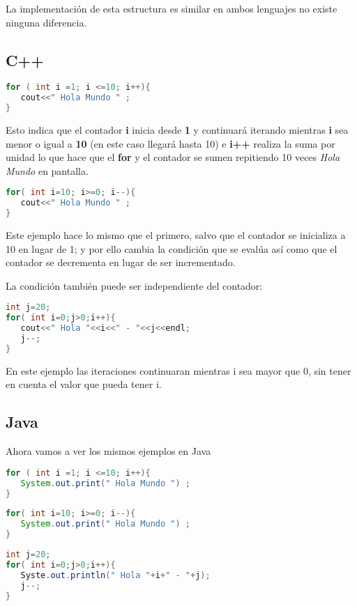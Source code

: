 La implementación de esta estructura es similar en ambos lenguajes no existe ninguna diferencia.

\subsection{C++}
\begin{lstlisting}[language=C++]
for ( int i =1; i <=10; i++){
   cout<<" Hola Mundo " ;
}
\end{lstlisting}

Esto indica que el contador \textbf{i} inicia desde \textbf{1} y continuará iterando mientras \textbf{i} sea menor o igual a \textbf{10}
(en este caso llegará hasta 10) e \textbf{i++} realiza la suma por unidad lo que hace que el \textbf{for} y el contador
se sumen repitiendo 10 veces \emph{Hola Mundo} en pantalla.

\begin{lstlisting}[language=C++]
for( int i=10; i>=0; i--){
   cout<<" Hola Mundo " ;
}
\end{lstlisting}

Este ejemplo hace lo mismo que el primero, salvo que el contador se inicializa a 10 en lugar de 1; y
 por ello cambia la condición que se evalúa así como que el contador se decrementa en lugar de ser
incrementado.

La condición también puede ser independiente del contador:

\begin{lstlisting}[language=C++]
int j=20;
for( int i=0;j>0;i++){
   cout<<" Hola "<<i<<" - "<<j<<endl;
   j--;
}
\end{lstlisting}

En este ejemplo las iteraciones continuaran mientras i sea mayor que 0, sin tener en cuenta el valor
que pueda tener i.

\subsection{Java}

Ahora vamos a ver  los mismos ejemplos en Java

\begin{lstlisting}[language=Java]
for ( int i =1; i <=10; i++){
   System.out.print(" Hola Mundo ") ;
}
\end{lstlisting}

\begin{lstlisting}[language=Java]
for( int i=10; i>=0; i--){
   System.out.print(" Hola Mundo ") ;
}
\end{lstlisting}

\begin{lstlisting}[language=Java]
int j=20;
for( int i=0;j>0;i++){
   Syste.out.println(" Hola "+i+" - "+j);
   j--;
}
\end{lstlisting}

